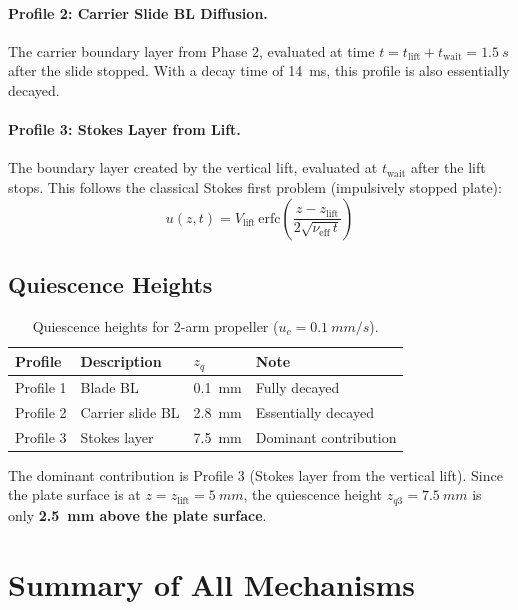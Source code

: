 \documentclass[11pt,a4paper]{article}
\begin{document}
\paragraph{Profile 2: Carrier Slide BL Diffusion.}
The carrier boundary layer from Phase 2, evaluated at time
$t = t_\mathrm{lift} + t_\mathrm{wait} = \SI{1.5}{s}$ after the slide stopped.
With a decay time of \SI{14}{ms}, this profile is also essentially decayed.

\paragraph{Profile 3: Stokes Layer from Lift.}
The boundary layer created by the vertical lift, evaluated at $t_\mathrm{wait}$
after the lift stops. This follows the classical Stokes first problem
(impulsively stopped plate):
\begin{equation}
  u(z, t) = V_\mathrm{lift}\,\mathrm{erfc}\!\left(\frac{z - z_\mathrm{lift}}{2\sqrt{\nu_\mathrm{eff}\,t}}\right)
\end{equation}

\subsection{Quiescence Heights}

\begin{table}[H]
\centering
\caption{Quiescence heights for 2-arm propeller ($u_c = \SI{0.1}{mm/s}$).}
\label{tab:quiescence}
\begin{tabular}{llll}
\toprule
Profile & Description & $z_q$ & Note \\
\midrule
Profile 1 & Blade BL & \SI{0.1}{mm} & Fully decayed \\
Profile 2 & Carrier slide BL & \SI{2.8}{mm} & Essentially decayed \\
Profile 3 & Stokes layer & \SI{7.5}{mm} & Dominant contribution \\
\bottomrule
\end{tabular}
\end{table}

The dominant contribution is Profile 3 (Stokes layer from the vertical lift).
Since the plate surface is at $z = z_\mathrm{lift} = \SI{5}{mm}$, the
quiescence height $z_{q3} = \SI{7.5}{mm}$ is only \textbf{\SI{2.5}{mm} above
the plate surface}.


\section{Summary of All Mechanisms}
\label{sec:summary_mechanisms}
\end{document}
